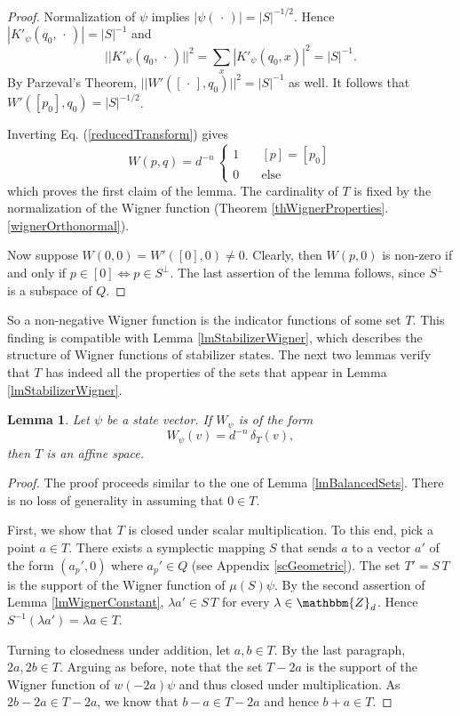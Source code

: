 \documentclass[aps,twocolumn,floatfix]{revtex4}
\newtheorem{lemma}[theorem]{Lemma}
\def\ZZ{\mathbbm{Z}}
\def\spacedot{\,\cdot\,}
\begin{document}
\begin{proof}
	Normalization of $\psi$ implies $|\psi(\spacedot)|=|S|^{-1/2}$. 
	Hence $|K'_\psi(q_0,\spacedot)|=|S|^{-1}$  and
	\begin{equation*}
		||K'_\psi(q_0,\spacedot)||^2=\sum_x |K'_\psi(q_0,x)|^2=|S|^{-1}.
	\end{equation*}
	By Parzeval's Theorem, $||W'([\spacedot],q_0)||^2=|S|^{-1}$ as well.
	It follows that $W'([p_0],q_0)=|S|^{-1/2}$.
	
	Inverting Eq. (\ref{reducedTransform}) gives
	\begin{equation}\label{wignerIndicator}
		W(p,q)= 
		d^{-n}\,
		\left\{ 
			\begin{array}{ll}
				1	\quad	&	[p]=[p_0] \\
				0				& \text{else}
			\end{array}
		\right.
	\end{equation}
	which proves the first claim of the lemma. The cardinality of $T$ is
	fixed by the normalization of the Wigner function (Theorem
	\ref{thWignerProperties}.\ref{wignerOrthonormal}).

	Now suppose $W(0,0)=W'([0],0)\neq 0$. Clearly, then $W(p,0)$ is
	non-zero if and only if $p\in [0]\Leftrightarrow p \in S^\bot$.
	The last assertion of the lemma follows, since $S^\bot$ is a
	subspace of $Q$.
\end{proof}

So a non-negative Wigner function is the indicator functions of some
set $T$. This finding is compatible with Lemma
\ref{lmStabilizerWigner}, which describes the structure of Wigner
functions of stabilizer states. The next two lemmas verify that $T$
has indeed all the properties of the sets that appear in Lemma
\ref{lmStabilizerWigner}.

\begin{lemma}
	Let $\psi$ be a state vector. If $W_\psi$ is of the form
	\begin{equation*}
		W_\psi(v) = d^{-n}\,\delta_T(v),
	\end{equation*}
	then $T$ is an affine space.
\end{lemma}

\begin{proof}
	The proof proceeds similar to the one of Lemma \ref{lmBalancedSets}. 
	There is no loss of generality in assuming that $0\in T$. 
	
	First, we show that $T$ is closed under scalar multiplication. To
	this end, pick a point $a\in T$. There exists a symplectic mapping
	$S$ that sends $a$ to a vector $a'$ of the form $(a_p',0)$ where
	$a_p'\in Q$ (see Appendix \ref{scGeometric}).  The set $T'=S\,T$ is
	the support of the Wigner function of $\mu(S)\psi$. By the second
	assertion of Lemma \ref{lmWignerConstant}, $\lambda a' \in S\,T$ for
	every $\lambda\in\ZZ_d$. Hence $S^{-1} (\lambda a') = \lambda a \in
	T$.
	
	Turning to closedness under addition, let $a,b\in T$. By the last
	paragraph, $2a, 2b \in T$. Arguing as before, note that the set
	$T-2a$ is the support of the Wigner function of $w(-2a)\psi$ and
	thus closed under multiplication. As $2b-2a\in T-2a$, we know that
	$b-a\in T-2a$ and hence $b+a\in T$.  
\end{proof}
\end{document}
